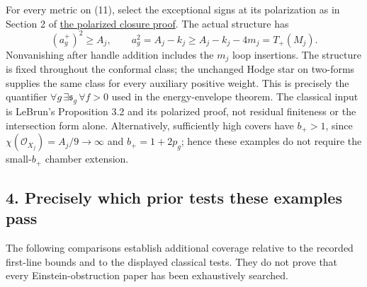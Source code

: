 \documentclass[
  10pt,
]{article}
\begin{document}
For every metric on (11), select the exceptional signs at its
polarization as in Section 2 of \href{lebrun_stability_closure.md}{the
polarized closure proof}. The actual structure has \[
 (a_g^+)^2\ge A_j,\qquad a_g^2=A_j-k_j\ge A_j-k_j-4m_j=T_+(M_j).
\] Nonvanishing after handle addition includes the \(m_j\) loop
insertions. The structure is fixed throughout the conformal class; the
unchanged Hodge star on two-forms supplies the same class for every
auxiliary positive weight. This is precisely the quantifier
\(\forall g\,\exists\mathfrak s_g\,\forall f>0\) used in the
energy-envelope theorem. The classical input is LeBrun's Proposition 3.2
and its polarized proof, not residual finiteness or the intersection
form alone. Alternatively, sufficiently high covers have \(b_+>1\),
since \(\chi(\mathcal O_{X_j})=A_j/9\to\infty\) and \(b_+=1+2p_g\);
hence these examples do not require the small-\(b_+\) chamber extension.

\hypertarget{precisely-which-prior-tests-these-examples-pass}{%
\subsection{4. Precisely which prior tests these examples
pass}\label{precisely-which-prior-tests-these-examples-pass}}

The following comparisons establish additional coverage relative to the
recorded first-line bounds and to the displayed classical tests. They do
not prove that every Einstein-obstruction paper has been exhaustively
searched.
\end{document}
